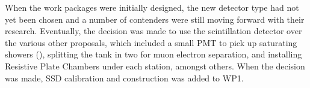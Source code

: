 When the work packages were initially designed, the new detector type had not yet been chosen and a number of contenders were still moving forward with their research. Eventually, the decision was made to use the scintillation detector over the various other proposals, which included a small PMT to pick up saturating showers (\cite{dynrang}), splitting the tank in two for muon electron separation, and installing Resistive Plate Chambers under each station, amongst others. When the decision was made, SSD calibration and construction was added to WP1. %
